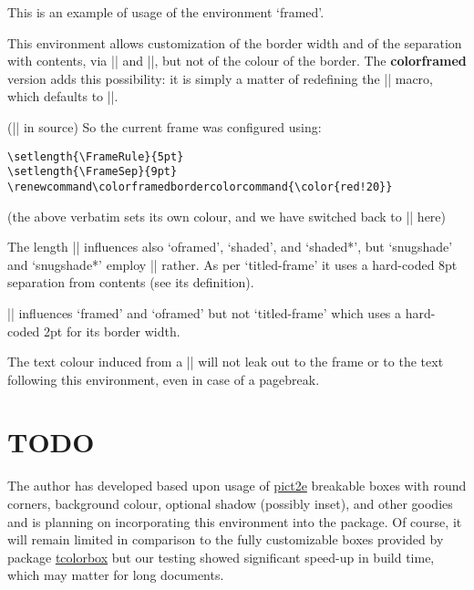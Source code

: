 \documentclass[a4paper,dvipdfmx,10pt,english]{article}
\def\colorframedbordercolorcommand{\color{red!20}}
\def\ctanpackage#1{\href{https://ctan.org/pkg/#1}{#1}}
\newcommand\colorframed{%
        \texorpdfstring{{\color{joli}\bfseries colorframed}}{colorframed}\xspace}
\begin{document}
\begin{framed}
  This is an example of usage of the environment `framed'.

  This environment allows customization of the border width
  and of the separation with contents, via |\FrameRule| and
  |\FrameSep|, but not of the colour of the border.  The
  \colorframed version adds this possibility: it is simply a
  matter of redefining the |\colorframedbordercolorcommand|
  macro, which defaults to |\normalcolor|.

\footnotesize (|\color{blue}| in source)
\normalsize
\color{blue}
  So the current frame was configured using:
\begin{verbatim}
\setlength{\FrameRule}{5pt}
\setlength{\FrameSep}{9pt}
\renewcommand\colorframedbordercolorcommand{\color{red!20}}
\end{verbatim}
\begin{footnotesize}\normalcolor
  (the above verbatim sets its own colour, and we have switched
  back to |\normalcolor| here)

  The length |\FrameSep| influences also `oframed', `shaded', and `shaded*',
  but `snugshade' and `snugshade*' employ |\fboxsep| rather.  As per `titled-frame'
  it uses a hard-coded 8pt separation from contents (see its definition).

  |\FrameRule| influences `framed' and `oframed' but not
  `titled-frame' which uses a hard-coded 2pt for its border width.\par
\end{footnotesize}
  The text colour induced from a |\color{blue}|
  will not leak out to the frame or to the text following this
  environment, even in case of a pagebreak.
\end{framed}

\section{TODO}

The author has developed based upon usage of \ctanpackage{pict2e}
breakable boxes with round corners, background colour, optional
shadow (possibly inset), and other goodies and is planning on
incorporating this environment into the package.
%
Of course, it will remain limited in comparison to the fully
customizable boxes provided by package \ctanpackage{tcolorbox}
but our testing showed significant speed-up in build time, which
may matter for long documents.

\end{document}
